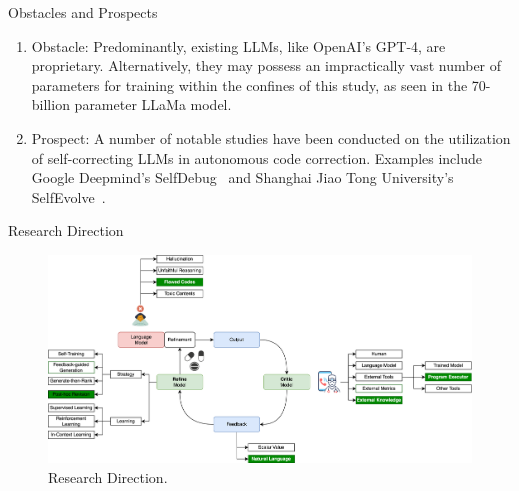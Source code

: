 \begin{frame}{Obstacles and Prospects}
    \begin{enumerate}
        \item Obstacle: Predominantly, existing LLMs, like OpenAI's GPT-4, are proprietary. Alternatively, they may possess an impractically vast number of parameters for training within the confines of this study, as seen in the 70-billion parameter LLaMa model.

        \item Prospect: A number of notable studies have been conducted on the utilization of self-correcting LLMs in autonomous code correction. Examples include Google Deepmind's SelfDebug~\cite{chen2023teaching} and Shanghai Jiao Tong University's SelfEvolve~\cite{jiang2023selfevolve}.
    \end{enumerate}
\end{frame}

\begin{frame}{Research Direction}
    \begin{figure}[!htb]
        \centering
        \includegraphics[width=1\textwidth]{img/direction_of_research}
        \captionsetup{font=small,labelformat=empty}
        \caption{Research Direction.}
    \end{figure}
\end{frame}
